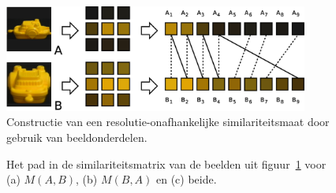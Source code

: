 
\begin{figure}[tbp]
\begin{center}
\includegraphics[width=10cm]{images/multires.eps}
\caption{\label{fig:multires}Constructie van een resolutie-onafhankelijke similariteitsmaat door gebruik van beeldonderdelen.}
\end{center}
\end{figure}

\begin{figure}[tbp]
\begin{center}
\caption{\label{fig:multires_sim-matrices}Het pad in de similariteitsmatrix van de beelden uit 
figuur~\ref{fig:multires} voor (a) $M(A,B)$, (b) $M(B,A)$ en (c) beide.}
\end{center}
\end{figure}


